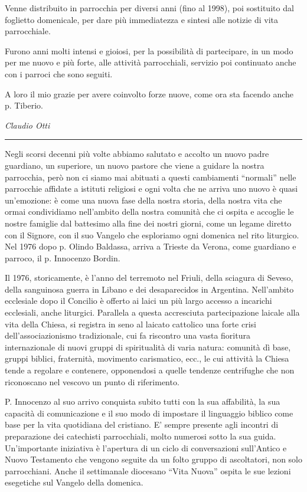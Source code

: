 Venne distribuito in parrocchia per diversi anni (fino al 1998), poi sostituito dal foglietto 
domenicale, per dare più immediatezza e sintesi alle notizie di vita parrocchiale.

Furono anni molti intensi e gioiosi, per la possibilità di partecipare, in un modo per me nuovo e più 
forte, alle attività parrocchiali, servizio poi continuato anche con i parroci che sono seguiti.

A loro il mio grazie per avere coinvolto forze nuove, come ora sta facendo anche p. Tiberio.\par
\hfill\textit{Claudio Otti}
\begin{center}
	\noindent\rule{0.5\textwidth}{0.4pt}
\end{center}
Negli scorsi decenni più volte abbiamo salutato e accolto un nuovo padre guardiano, un  
superiore, un nuovo pastore che viene a guidare la nostra parrocchia, però non ci siamo mai abituati 
a questi cambiamenti “normali” nelle parrocchie affidate a istituti religiosi e ogni volta che ne arriva 
uno nuovo è quasi un’emozione: è come una nuova fase della nostra storia, della nostra vita che 
ormai condividiamo nell’ambito della nostra comunità che ci ospita e accoglie le nostre famiglie dal 
battesimo alla fine dei nostri giorni, come un legame diretto con il Signore, con il suo Vangelo che 
esploriamo ogni domenica nel rito liturgico. Nel 1976 dopo p. Olindo Baldassa, arriva a Trieste da 
Verona,  come guardiano e parroco, il p. Innocenzo Bordin. 

Il 1976, storicamente, è l’anno del terremoto nel Friuli, della sciagura di Seveso, della  
sanguinosa guerra in Libano e dei desaparecidos in Argentina. Nell’ambito ecclesiale dopo il 
Concilio è offerto ai laici un più largo accesso a incarichi ecclesiali, anche liturgici. Parallela a 
questa accresciuta partecipazione laicale alla vita della Chiesa, si registra in seno al laicato cattolico 
una forte crisi dell'associazionismo tradizionale, cui fa riscontro una vasta fioritura internazionale di 
nuovi gruppi di spiritualità di varia natura: comunità dì base, gruppi biblici, fraternità, movimento 
carismatico, ecc., le cui attività la Chiesa tende a regolare e contenere, opponendosi a quelle 
tendenze centrifughe che non riconoscano nel vescovo un punto di riferimento.

P. Innocenzo al suo arrivo conquista  subito tutti con la sua affabilità,  la  sua capacità di  
comunicazione e il suo modo di impostare il linguaggio biblico come base per la vita quotidiana del 
cristiano. E’ sempre presente agli incontri di preparazione dei catechisti parrocchiali, molto 
numerosi sotto la sua guida.  Un’importante iniziativa è l’apertura di un ciclo di conversazioni 
sull’Antico e Nuovo Testamento che vengono seguite da un folto gruppo di ascoltatori, non solo 
parrocchiani. Anche il settimanale diocesano “Vita Nuova” ospita  le sue lezioni esegetiche sul 
Vangelo della domenica. 

